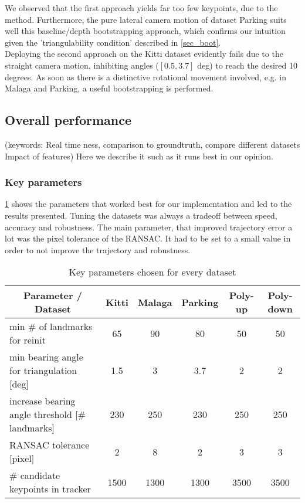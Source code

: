 We observed that the first approach yields far too few keypoints, due to the  method. Furthermore, the pure lateral camera motion of dataset Parking suits well this baseline/depth bootstrapping approach, which confirms our intuition given the 'triangulability condition' described in \cref{sec_boot}.\\

Deploying the second approach on the Kitti dataset evidently fails due to the straight camera motion, inhibiting angles ($[0.5, 3.7]$ deg) to reach the desired 10 degrees. As soon as there is a distinctive rotational movement involved, e.g. in Malaga and Parking, a useful bootstrapping is performed.


\subsection{Overall performance}
\textcolor[rgb]{1,0,0}{(keywords: Real time ness, comparison to groundtruth, compare different datasets
Impact of features) Here we describe it such as it runs best in our opinion.}

\subsubsection{Key parameters}
\label{sec_key_params}
\cref{params_table} shows the parameters that worked best for our implementation and led to the results presented. Tuning the datasets was always a tradeoff between speed, accuracy and robustness. The main parameter, that improved trajectory error a lot was the pixel tolerance of the RANSAC. It had to be set to a small value in order to not improve the trajectory and robustness.
\begin{table}[!h]
	\centering
	\begin{tabular}{|l|c|c|c|c|c|}
	\hline
	\multicolumn{1}{|c|}{\textbf{Parameter / Dataset}} & \textbf{Kitti} & \textbf{Malaga} & \textbf{Parking} & \textbf{Poly-up} & \textbf{Poly-down} \\ \hline
	min \# of landmarks for reinit                     & 65             &  90               & 80               & 50               & 50\\ \hline
	min bearing angle for triangulation {[}deg{]}      & 1.5            &  3         & 3.7              & 2                &
2\\ \hline
	increase bearing angle threshold {[}\# landmarks{]}& 230            &  250               & 230              & 250              & 250\\ \hline
	RANSAC tolerance {[}pixel{]}                       & 2              & 8                & 2                & 3                &
3\\ \hline
	\# candidate keypoints in tracker                  & 1500           &   1300              & 1300             & 3500             & 3500\\ \hline
	\end{tabular}
	\caption{Key parameters chosen for every dataset}
	\label{params_table}
\end{table}
	
